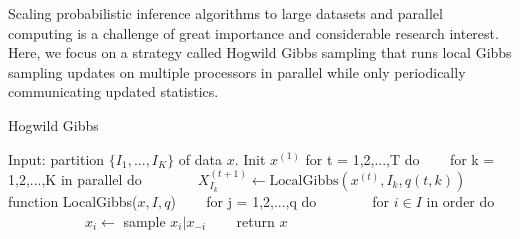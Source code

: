 Scaling probabilistic inference algorithms to large datasets and parallel computing is a challenge of great importance and considerable research interest. Here, we focus on a strategy called Hogwild Gibbs sampling that runs local Gibbs sampling updates on multiple processors in parallel while only periodically communicating updated statistics.


\begin{algorithm}
\caption{Hogwild Gibbs}
\label{alg:hogwild_gibbs}
\begin{algorithmic}[1]
\STATE Input: partition $\{I_1,...,I_K \}$ of data $x$. 
\STATE Init $x^{(1)}$ 
\STATE for t = 1,2,...,T do 
\STATE ~~~ for k = 1,2,...,K in parallel do 
\STATE ~~~ ~~~ $X_{I_k}^{(t+1)} \leftarrow \mathrm{LocalGibbs}(x^{(t)},I_k,q(t,k))$ 
\STATE
\STATE function LocalGibbs($x, I, q$) 
\STATE ~~~ for j = 1,2,...,q do
\STATE ~~~ ~~~ for $i\in I$ in order do 
\STATE ~~~ ~~~ ~~~ $x_i \leftarrow$ sample $x_i | x_{-i}$ 
\STATE ~~~ return $x$ 
\end{algorithmic}
\end{algorithm}


